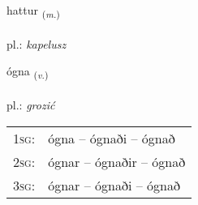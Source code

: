 \documentclass[frontgrid, backgrid]{flacards}\usepackage[]{graphicx}\usepackage[]{xcolor}
\begin{document}
\renewcommand{\flhead}{\vskip5pt \fboxsep=0pt {\small\bfseries\footnotesize Nafnorð | rzeczownik}}
\renewcommand{\fcfoot}{\vskip5pt \fboxsep=0pt \hspace{2pt}{\small\bfseries\footnotesize 3K}}

\renewcommand{\blhead}{\vskip5pt {\small\bfseries\footnotesize Nafnorð | rzeczownik }}
\renewcommand{\bcfoot}{\vskip5pt \hspace{2pt}{\small\bfseries\footnotesize 3K}}


{hattur \small{\textsubscript{(\textit{m.})}} \\[1ex] %
\textphonetic{[hahtʏr]} \\
pl.: \emph{kapelusz} \\  [2ex]
\renewcommand*{\arraystretch}{0.8}
}

\renewcommand{\flhead}{\vskip5pt \fboxsep=0pt {\small\bfseries\footnotesize Sagnorð | czasownik}}
\renewcommand{\fcfoot}{\vskip5pt \fboxsep=0pt \hspace{2pt}{\small\bfseries\footnotesize 3K}}

\renewcommand{\blhead}{\vskip5pt {\small\bfseries\footnotesize Sagnorð | czasownik }}
\renewcommand{\bcfoot}{\vskip5pt \hspace{2pt}{\small\bfseries\footnotesize 3K}}


{ógna \small{\textsubscript{(\textit{v.})}} \\[1ex] %
\textphonetic{[oukna]} \\
pl.: \emph{grozić} \\  [2ex]
\renewcommand*{\arraystretch}{0.8}
\begin{tabular}{p{1cm}l}
\textsc{1sg}: & ógna -- ógnaði -- ógnað \\ 
\textsc{2sg}: & ógnar -- ógnaðir -- ógnað \\ 
\textsc{3sg}: & ógnar -- ógnaði -- ógnað \\ 
\end{tabular}
}
\end{document}
